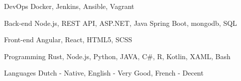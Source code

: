 

\begin{cvskills}

  \cvskill
    {DevOps} %
    {Docker, Jenkins, Ansible, Vagrant} %

  \cvskill
    {Back-end} %
    {Node.js, REST API, ASP.NET, Java Spring Boot, mongodb, SQL} %

  \cvskill
    {Front-end} %
    {Angular, React, HTML5, SCSS} %

  \cvskill
    {Programming} %
    {Rust, Node.js, Python, JAVA, C\#, R, Kotlin, XAML, Bash} %

  \cvskill
    {Languages} %
	{Dutch - Native, English - Very Good, French - Decent} %

\end{cvskills}
